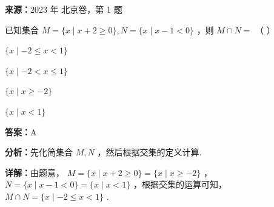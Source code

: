 \begin{question}[points=4]
\textbf{来源：}2023 年 北京卷，第 1 题\par
已知集合 $M = \{x \mid x + 2 \ge 0\}, N = \{x \mid x - 1 < 0\}$ ，则 $M \cap N =$ （ ）
\begin{choices}
  \item $\{x \mid -2 \le x < 1\}$
  \item $\{x \mid -2 < x \le 1\}$
  \item $\{x \mid x \ge -2\}$
  \item $\{x \mid x < 1\}$
\end{choices}
\begin{solution}
\textbf{答案：}A

\textbf{分析：}先化简集合 $M, N$ ，然后根据交集的定义计算.

\textbf{详解：}由题意， $M = \{x \mid x + 2 \ge 0\} = \{x \mid x \ge -2\}$ ， $N = \{x \mid x - 1 < 0\} = \{x \mid x < 1\}$ ，根据交集的运算可知， $M \cap N = \{x \mid -2 \le x < 1\}$ .
\end{solution}
\end{question}

